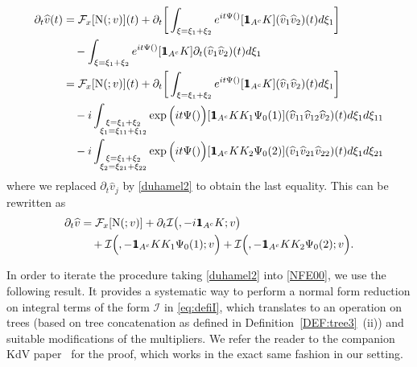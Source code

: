 \documentclass[a4paper,
11pt,  reqno]{amsart}
\makeatletter
\newcommand{\mathbbm}[1]{\mathchoice%
    {\hbox{\sffamily 1\kern-.40em 1}}%
    {\hbox{\sffamily 1\kern-.40em 1}}%
    {\hbox{\scriptsize\sffamily 1\kern-.30em 1}}%
    {\hbox{\tiny\sffamily 1\kern-.25em 1}}}%
\newcommand{\5}{\textup{V}}
\newcommand{\ft}{\widehat}
\newcommand{\ind}{\mathbbm 1}
\newcommand{\dt}{\partial_t}
\theoremstyle{remark}
\newcommand{\Ft}{{\mathcal{F}}}
\def\<#1>{\csname MH@symb@#1\endcsname}
\newcommand{\Ical}{\mathcal{I}}
\numberwithin{equation}{section}
\numberwithin{theorem}{section}
\newcommand{\NN}{\mathrm{N}}
\makeatother
\begin{document}
\begin{align}
\label{NFE01}
\begin{split}
\dt\ft v(t)  
&=
\Ft_x[ \NN ( \<1>; v )] (t)
+ \dt\bigg[ \int_{\xi = \xi_1 + \xi_2} e^{it \Psi(\<1>)} 
[\ind_{A^c}
 K ] 
(\ft v_{1} \ft v_{2} )(t)
d\xi_{1} 
\bigg]
\\
&
\quad 
-
   \int_{\xi = \xi_1 + \xi_2} e^{it \Psi(\<1>)} 
[ \ind_{A^c} K ]
\partial_{t} (\ft v_{1} \ft v_{2} )(t)
d\xi_{1} 
\\
& =
\Ft_x[ \NN ( \<1>; v )] (t)
+  \dt\bigg[ \int_{\xi = \xi_1 + \xi_2} e^{it \Psi(\<1>)} 
[\ind_{A^c}
 K ] 
(\ft v_{1} \ft v_{2} )(t)
d\xi_{1} 
\bigg]
\\
&
\quad 
- i
 \int_{\substack{\xi = \xi_1 + \xi_2 \\ \xi_1 = \xi_{11}+ \xi_{12}  }} \exp\Big(it \Psi(\<21>) \Big)
[ \ind_{A^c} K K_1 \Psi_0(1) ]
 (\ft v_{11} \ft v_{12} \ft v_2 )(t)
d\xi_{1} d\xi_{11} 
\\
&
\quad 
-i  \int_{\substack{\xi = \xi_1 + \xi_2 \\ \xi_2 = \xi_{21}+ \xi_{22}  }} \exp\Big(it \Psi(\<22>) \Big)
[ \ind_{A^c} K K_2 \Psi_0(2) ]
 (\ft v_{1} \ft v_{21} \ft v_{22} )(t)
d\xi_{1} d\xi_{21}
\end{split}
\end{align}
where we replaced $\dt \ft v_j$ by \eqref{duhamel2} to obtain the last equality. This can be rewritten as
\begin{align}
\label{NFE00}
\begin{split}
\dt\ft v 
&
=
 \Ft_x[ \NN ( \<1>; v )] 
+ 
\dt\Ical \big( \<1>,  - i \ind_{A^c} K; v \big) 
\\
&
\quad 
+
\Ical \Big( \<21>, - \ind_{A^c} KK_1\Psi_0(1) ; v  \Big) 
+
\Ical \Big( \<22>, - \ind_{A^c} KK_2\Psi_0(2) ; v  \Big) 
. 
\end{split}
\end{align}






In order to iterate the procedure taking \eqref{duhamel2} into \eqref{NFE00}, we use the following result. It provides a systematic way to perform a normal form reduction on integral terms of the form $\Ical$ in \eqref{eq:defiI}, which translates to an operation on trees (based on tree concatenation as defined in Definition~\ref{DEF:tree3}~(ii)) and suitable modifications of the multipliers. We refer the reader to the companion KdV paper~\cite{chcora} for the proof, which works in the exact same fashion in our setting.
\end{document}
